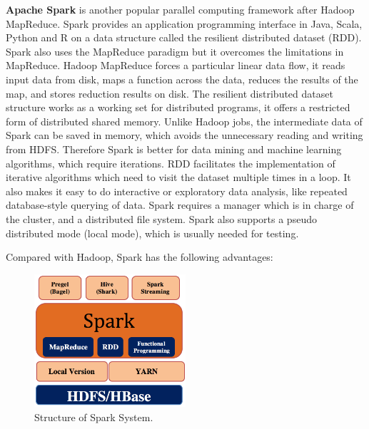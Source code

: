 \documentclass[	DIV=calc,%
							paper=a4,%
							fontsize=11pt,%
							twocolumn]{scrartcl}	 					%
\begin{document}
\textbf{Apache Spark} \cite{2} is another popular parallel computing framework after Hadoop MapReduce. Spark provides an application programming interface in Java, Scala, Python and R on a data structure called the resilient distributed dataset (RDD). Spark also uses the MapReduce paradigm but it overcomes the limitations in MapReduce. Hadoop MapReduce forces a particular linear data flow, it reads input data from disk, maps a function across the data, reduces the results of the map, and stores reduction results on disk. The resilient distributed dataset structure works as a working set for distributed programs, it offers a restricted form of distributed shared memory. Unlike Hadoop jobs, the intermediate data of Spark can be saved in memory, which avoids the unnecessary reading and writing from HDFS. Therefore Spark is better for data mining and machine learning algorithms, which require iterations. RDD facilitates the implementation of iterative algorithms which need to visit the dataset multiple times in a loop. It also makes it easy to do interactive or exploratory data analysis, like repeated database-style querying of data.
Spark requires a manager which is in charge of the cluster, and a distributed file system. Spark also supports a pseudo distributed mode (local mode), which is usually needed for testing.

Compared with Hadoop, Spark has the following advantages:

\begin{figure}
  \centering
    \includegraphics[width=0.5\textwidth]{images/spark.png}
    \caption{Structure of Spark System.}
    \label{fig:Spark}   
\end{figure}
\end{document}
